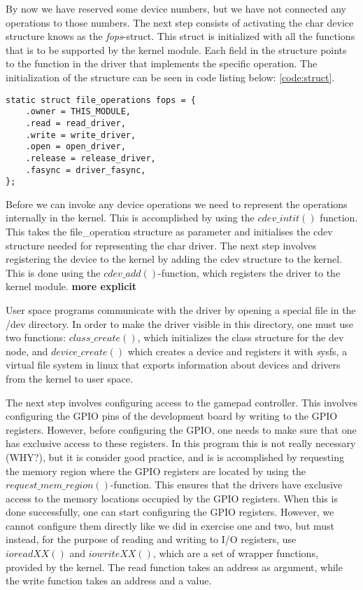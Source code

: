 By now we have reserved some device numbers, but we have not connected any operations to those numbers. The next step consists of activating the char device structure knows as the \emph{fops}-struct. This struct is initialized with all the functions that is to be supported by the kernel module. Each field in the structure points to the function in the driver that implements the specific operation. The initialization of the structure can be seen in code listing below: \ref{code:struct}. 

\begin{lstlisting}[caption=file operations, label=code:struct]
static struct file_operations fops = {
    .owner = THIS_MODULE,
    .read = read_driver,
    .write = write_driver,
    .open = open_driver,
    .release = release_driver,
    .fasync = driver_fasync,
};
\end{lstlisting}




Before we can invoke any device operations we need to represent the operations internally in the kernel. This is accomplished by using the $cdev\_intit()$ function. This takes the file\_operation structure as parameter and initialises the cdev structure needed for representing the char driver. The next step involves registering the device to the kernel by adding the cdev structure to the kernel. This is done using the $cdev\_add()$-function, which registers the driver to the kernel module. {\bf more explicit} 

User space programs communicate with the driver by opening a special file in the /dev directory. In order to make the driver visible in this directory, one must use two functions: $class\_create()$, which initializes the class structure for the dev node, and $device\_create()$ which creates a device and registers it with \emph sysfs, a virtual file system in linux that exports information about devices and drivers from the kernel to user space. 

The next step involves configuring access to the gamepad controller. This involves configuring the GPIO pins of the development board by writing to the GPIO registers. However, before configuring the GPIO, one needs to make sure that one has exclusive access to these registers. In this program this is not really necessary (WHY?), but it is consider good practice, and is is accomplished by requesting the memory region where the GPIO registers are located by using the  $request\_mem\_region()$-function. This ensures that the drivers have exclusive access to the memory locations occupied by the GPIO registers. When this is done successfully, one can start configuring the GPIO registers. However, we cannot configure them directly like we did in exercise one and two, but must instead, for the purpose of  reading and writing to I/O registers, use $ioreadXX()$ and $iowriteXX()$, which are a set of wrapper functions, provided by the kernel. The read function takes an address as argument, while the write function takes an address and a value. 



